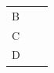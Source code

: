 {\begin{tabular}[t]{|l|l|l|}
        B &
    
    
         &
    
    
     \tabularnewline\cline{1-1}\cline{2-2}\cline{3-3}
    
    
        C &
    
    
         &
    
    
     \tabularnewline\cline{1-1}\cline{2-2}\cline{3-3}
    
    
        D &
    
    
         &
    
    
     \tabularnewline\cline{1-1}\cline{2-2}\cline{3-3}
    

\end{tabular}}
